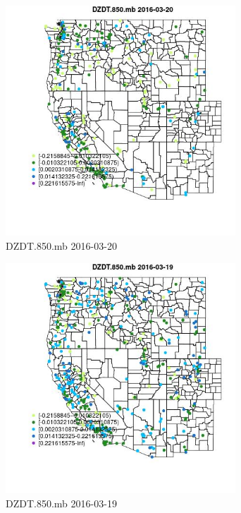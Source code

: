 \begin{figure} 
\centering  
\includegraphics[width=0.77\textwidth]{Code_Outputs/Report_ML_input_PM25_Step4_part_e_de_duplicated_aveswNAs_MapObsDZDT850mb2016-03-20.jpg} 
\caption{\label{fig:Report_ML_input_PM25_Step4_part_e_de_duplicated_aveswNAsMapObsDZDT850mb2016-03-20}DZDT.850.mb 2016-03-20} 
\end{figure} 
 

\begin{figure} 
\centering  
\includegraphics[width=0.77\textwidth]{Code_Outputs/Report_ML_input_PM25_Step4_part_e_de_duplicated_aveswNAs_MapObsDZDT850mb2016-03-19.jpg} 
\caption{\label{fig:Report_ML_input_PM25_Step4_part_e_de_duplicated_aveswNAsMapObsDZDT850mb2016-03-19}DZDT.850.mb 2016-03-19} 
\end{figure} 
 


